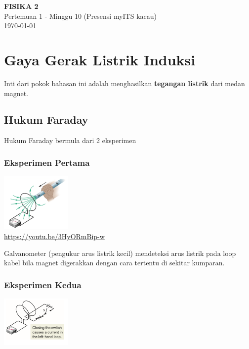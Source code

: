 \documentclass[twocolumn, 11pt]{article}%
\begin{document}
\begin{strip}
  \vspace*{\dimexpr-\stripsep}
  \begin{center}
      \Large\textbf{FISIKA 2}\\
      \large{Pertemuan 1 - Minggu 10 (Presensi myITS kacau)}\\
      \large{\today}
   \end{center}
\end{strip}

\section{Gaya Gerak Listrik Induksi}
Inti dari pokok bahasan ini adalah menghasilkan \textbf{tegangan listrik}
dari medan magnet.

\subsection{Hukum Faraday}%
Hukum Faraday bermula dari 2 eksperimen

\subsubsection{Eksperimen Pertama}%
\begin{center}
    \includegraphics[width=130px]{1.png}\\
    \url{https://youtu.be/3HyORmBip-w}
\end{center}

Galvanometer (pengukur arus listrik kecil) mendeteksi arus listrik pada
loop kabel bila magnet digerakkan dengan cara tertentu di sekitar
kumparan.

\subsubsection{Eksperimen Kedua}%
\begin{center}
    \includegraphics[width=130px]{2.png}
\end{center}
\end{document}
